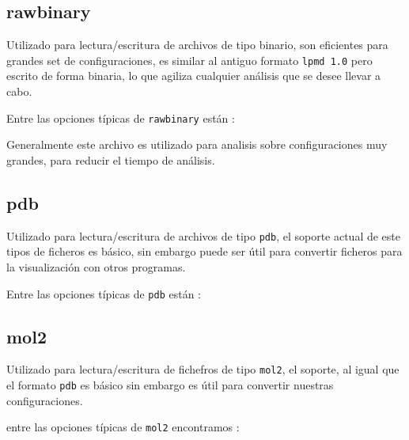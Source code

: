 \subsection{rawbinary}
Utilizado para lectura/escritura de archivos de tipo binario, son eficientes para grandes set de configuraciones, es similar al antiguo formato \verb|lpmd 1.0| pero escrito de forma binaria, lo que agiliza cualquier an\'alisis que se desee llevar a cabo.

Entre las opciones t\'ipicas de \verb|rawbinary| est\'an :


Generalmente este archivo es utilizado para analisis sobre configuraciones muy grandes, para reducir el tiempo de an\'alisis.

\subsection{pdb}
Utilizado para lectura/escritura de archivos de tipo \verb|pdb|, el soporte actual de este tipos de ficheros es b\'asico, sin embargo puede ser \'util para convertir ficheros para la visualizaci\'on con otros programas.

Entre las opciones t\'ipicas de \verb|pdb| est\'an :


\subsection{mol2}
Utilizado para lectura/escritura de fichefros de tipo \verb|mol2|, el soporte, al igual que el formato \verb|pdb| es b\'asico sin embargo es \'util para convertir nuestras configuraciones.

entre las opciones t\'ipicas de \verb|mol2| encontramos :

